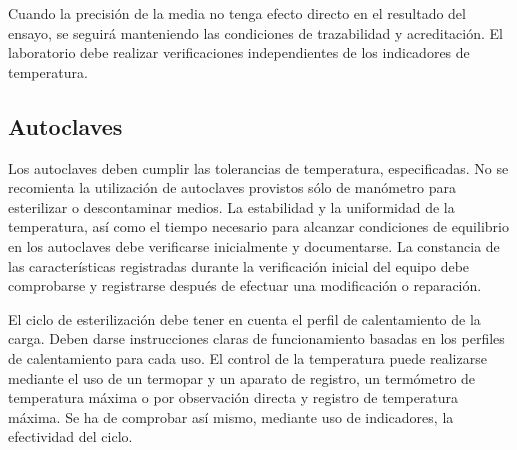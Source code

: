 Cuando la precisión de la media no tenga efecto directo en el resultado del ensayo, se seguirá manteniendo las condiciones de trazabilidad y acreditación. El laboratorio debe realizar verificaciones independientes de los indicadores de temperatura.
\subsection{Autoclaves}
Los autoclaves deben cumplir las tolerancias de temperatura, especificadas. No se recomienta la utilización de autoclaves provistos sólo de manómetro para esterilizar o descontaminar medios. La estabilidad y la uniformidad de la temperatura, así como el tiempo necesario para alcanzar condiciones de equilibrio en los autoclaves debe verificarse inicialmente y documentarse. La constancia de las características registradas durante la verificación inicial del equipo debe comprobarse y registrarse después de efectuar una modificación o reparación.

El ciclo de esterilización debe tener en cuenta el perfil de calentamiento de la carga. Deben darse instrucciones claras de funcionamiento basadas en los perfiles de calentamiento para cada uso. El control de la temperatura puede realizarse mediante el uso de un termopar y un aparato de registro, un termómetro de temperatura máxima o por observación directa y registro de temperatura máxima. Se ha de comprobar así mismo, mediante uso de indicadores, la efectividad del ciclo.


